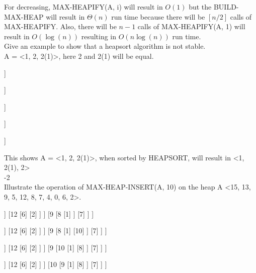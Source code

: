 \documentclass[12pt,largemargins]{homework}
\begin{document}
For decreasing, MAX-HEAPIFY(A, i) will result in $ O(1) $ but the BUILD-MAX-HEAP will result in $ \Theta(n) $ run time because there will be $ [n/2] $ calls of MAX-HEAPIFY. Also, there will be $ n-1 $ calls of MAX-HEAPIFY(A, 1) will result in $ O(\log(n)) $ resulting in $ O(n \log(n)) $ run time.\\
\question
Give an example to show that a heapsort algorithm is not stable.\\
A = <1, 2, 2(1)>, here 2 and 2(1) will be equal.\\
\begin{center}
\begin{forest}
	[1
		[2]
		[2(1)]
	]
\end{forest}
\begin{forest}
	[2
		[1]
		[2(1)]
	]
\end{forest}
\begin{forest}
	[2(1)
		[1]
		[|2|]
	]
\end{forest}
\begin{forest}
	[1
		[|2(1)|]
		[|2|]
	]
\end{forest}
\begin{forest}
	[|1|
		[|2(1)|]
		[|2|]
	]
\end{forest}
\end{center}
This shows A = <1, 2, 2(1)>, when sorted by HEAPSORT, will result in <1, 2(1), 2>\\
-2\\
Illustrate the operation of MAX-HEAP-INSERT(A, 10) on the heap A <15, 13, 9, 5, 12, 8, 7, 4, 0, 6, 2>.\\
\begin{center}
\begin{forest}
	[15
		[13
			[5
				[4]
				[0]
			]
			[12
				[6]
				[2]
			]
		]
		[9
			[8
				[1]
			]
			[7]
		]
	]
\end{forest}
\begin{forest}
	[15
		[13
			[5
				[4]
				[0]
			]
			[12
				[6]
				[2]
			]
		]
		[9
			[8
				[1]
				[10]
			]
			[7]
		]
	]
\end{forest}
\begin{forest}
	[15
		[13
			[5
				[4]
				[0]
			]
			[12
				[6]
				[2]
			]
		]
		[9
			[10
				[1]
				[8]
			]
			[7]
		]
	]
\end{forest}
\begin{forest}
	[15
		[13
			[5
				[4]
				[0]
			]
			[12
				[6]
				[2]
			]
		]
		[10
			[9
				[1]
				[8]
			]
			[7]
		]
	]
\end{forest}
\end{center}
\end{document}
